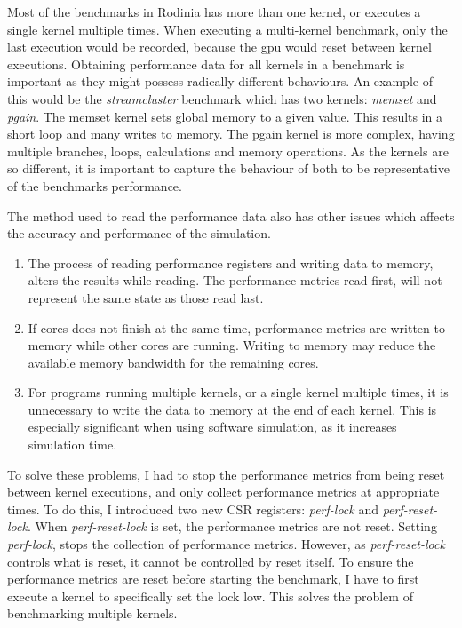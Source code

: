 Most of the benchmarks in Rodinia has more than one kernel, or executes a single kernel multiple times. When executing a multi-kernel benchmark, only the last execution would be recorded, because the \acrshort{gpu} would reset between kernel executions. Obtaining performance data for all kernels in a benchmark is important as they might possess radically different behaviours. An example of this would be the \textit{streamcluster} benchmark which has two kernels: \textit{memset} and \textit{pgain}. The memset kernel sets global memory to a given value. This results in a short loop and many writes to memory. The pgain kernel is more complex, having multiple branches, loops, calculations and memory operations. As the kernels are so different, it is important to capture the behaviour of both to be representative of the benchmarks performance.

The method used to read the performance data also has other issues which affects the accuracy and performance of the simulation.
\begin{enumerate}
    \item The process of reading performance registers and writing data to memory, alters the results while reading. The performance metrics read first, will not represent the same state as those read last.
    \item If cores does not finish at the same time, performance metrics are written to memory while other cores are running. Writing to memory may reduce the available memory bandwidth for the remaining cores.
    \item For programs running multiple kernels, or a single kernel multiple times, it is unnecessary to write the data to memory at the end of each kernel. This is especially significant when using software simulation, as it increases simulation time.
\end{enumerate}

To solve these problems, I had to stop the performance metrics from being reset between kernel executions, and only collect performance metrics at appropriate times. To do this, I introduced two new CSR registers: \textit{perf-lock} and \textit{perf-reset-lock}. When \textit{perf-reset-lock} is set, the performance metrics are not reset. Setting \textit{perf-lock}, stops the collection of performance metrics. However, as \textit{perf-reset-lock} controls what is reset, it cannot be controlled by reset itself. To ensure the performance metrics are reset before starting the benchmark, I have to first execute a kernel to specifically set the lock low. This solves the problem of benchmarking multiple kernels.

